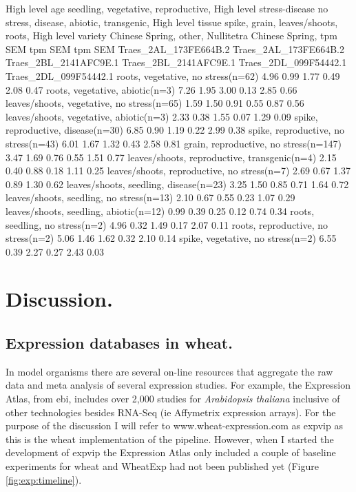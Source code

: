 \begin{landscape}
\begin{code_2}[label=lst:exp:exportSample, caption={[Export data example] Export data example, corresponding to the data plot in Figure \ref{fig:exp:tutorial1}}]
High level age	seedling, vegetative, reproductive, 
High level stress-disease	no stress, disease, abiotic, transgenic, 
High level tissue	spike, grain, leaves/shoots, roots, 
High level variety	Chinese Spring, other, Nullitetra Chinese Spring, 
	tpm	SEM	tpm	SEM	tpm	SEM	
	Traes_2AL_173FE664B.2	Traes_2AL_173FE664B.2	Traes_2BL_2141AFC9E.1	Traes_2BL_2141AFC9E.1	Traes_2DL_099F54442.1	Traes_2DL_099F54442.1	
roots, vegetative, no stress(n=62)	4.96	0.99	1.77	0.49	2.08	0.47
roots, vegetative, abiotic(n=3)	7.26	1.95	3.00	0.13	2.85	0.66
leaves/shoots, vegetative, no stress(n=65)	1.59	1.50	0.91	0.55	0.87	0.56
leaves/shoots, vegetative, abiotic(n=3)	2.33	0.38	1.55	0.07	1.29	0.09
spike, reproductive, disease(n=30)	6.85	0.90	1.19	0.22	2.99	0.38
spike, reproductive, no stress(n=43)	6.01	1.67	1.32	0.43	2.58	0.81
grain, reproductive, no stress(n=147)	3.47	1.69	0.76	0.55	1.51	0.77
leaves/shoots, reproductive, transgenic(n=4)	2.15	0.40	0.88	0.18	1.11	0.25
leaves/shoots, reproductive, no stress(n=7)	2.69	0.67	1.37	0.89	1.30	0.62
leaves/shoots, seedling, disease(n=23)	3.25	1.50	0.85	0.71	1.64	0.72
leaves/shoots, seedling, no stress(n=13)	2.10	0.67	0.55	0.23	1.07	0.29
leaves/shoots, seedling, abiotic(n=12)	0.99	0.39	0.25	0.12	0.74	0.34
roots, seedling, no stress(n=2)	4.96	0.32	1.49	0.17	2.07	0.11
roots, reproductive, no stress(n=2)	5.06	1.46	1.62	0.32	2.10	0.14
spike, vegetative, no stress(n=2)	6.55	0.39	2.27	0.27	2.43	0.03
\end{code_2}
\end{landscape}

\section{Discussion.} 



\subsection{Expression databases in wheat.}
In model organisms there are several on-line resources that aggregate the raw data and meta analysis of several expression studies. 
For example, the Expression Atlas, from \gls{ebi},  includes over 2,000 studies for \textit{Arabidopsis thaliana} inclusive of other technologies besides RNA-Seq (ie Affymetrix expression arrays). 
For the purpose of the discussion I will refer to www.wheat-expression.com as \gls{expvip} as this is the wheat implementation of the pipeline.  
However, when I started the development of \gls{expvip} the Expression Atlas only included a couple of baseline experiments for wheat and WheatExp had not been published yet (Figure \ref{fig:exp:timeline}).  

